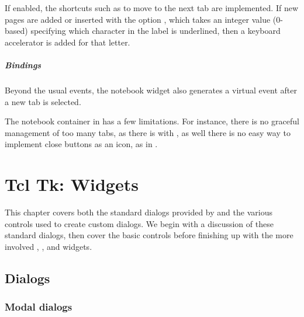 If enabled, the shortcuts such as  to move to the
next tab are implemented. If new pages are added or inserted with the
option , which takes an integer value
(0-based) specifying which character in the label is underlined, then
a keyboard accelerator is added for that letter.

\paragraph{Bindings}
Beyond the usual events, the notebook widget also generates a
 virtual event after a new tab is
selected.

The notebook container in \TK\/ has a few limitations. For instance,
there is no graceful management of too many tabs, as there is with
\GTK, as well there is no easy way to implement close buttons as an
icon, as in \Qt.


\chapter{Tcl Tk: Widgets}
\label{sec:tcltk:widgets}

This chapter covers both the standard dialogs provided by \TK\/ and
the various controls used to create custom dialogs. We begin with a
discussion of these standard dialogs, then cover the basic controls
before finishing up with the more involved ,
, and  widgets.




\section{Dialogs}
\label{sec:tcltk:dialogs}
\subsection{Modal dialogs}
\label{sec:modal-dialogs}

